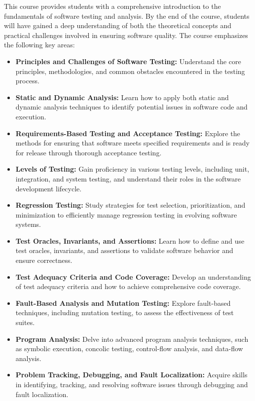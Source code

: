 \documentclass [11pt]{article}
\begin{document}
This course provides students with a comprehensive introduction to the fundamentals of software testing and analysis. By the end of the course, students will have gained a deep understanding of both the theoretical concepts and practical challenges involved in ensuring software quality. The course emphasizes the following key areas:

\begin{itemize}
    \item \textbf{Principles and Challenges of Software Testing:} Understand the core principles, methodologies, and common obstacles encountered in the testing process.
    \item \textbf{Static and Dynamic Analysis:} Learn how to apply both static and dynamic analysis techniques to identify potential issues in software code and execution.
    \item \textbf{Requirements-Based Testing and Acceptance Testing:} Explore the methods for ensuring that software meets specified requirements and is ready for release through thorough acceptance testing.
    \item \textbf{Levels of Testing:} Gain proficiency in various testing levels, including unit, integration, and system testing, and understand their roles in the software development lifecycle.
    \item \textbf{Regression Testing:} Study strategies for test selection, prioritization, and minimization to efficiently manage regression testing in evolving software systems.
    \item \textbf{Test Oracles, Invariants, and Assertions:} Learn how to define and use test oracles, invariants, and assertions to validate software behavior and ensure correctness.
    \item \textbf{Test Adequacy Criteria and Code Coverage:} Develop an understanding of test adequacy criteria and how to achieve comprehensive code coverage.
    \item \textbf{Fault-Based Analysis and Mutation Testing:} Explore fault-based techniques, including mutation testing, to assess the effectiveness of test suites.
    \item \textbf{Program Analysis:} Delve into advanced program analysis techniques, such as symbolic execution, concolic testing, control-flow analysis, and data-flow analysis.
    \item \textbf{Problem Tracking, Debugging, and Fault Localization:} Acquire skills in identifying, tracking, and resolving software issues through debugging and fault localization.

\end{itemize}
\end{document}
